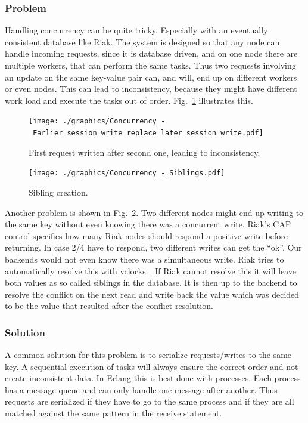 \documentclass[11pt,a4paper]{report}
\begin{document}
\subsubsection{Problem}
Handling concurrency can be quite tricky.
Especially with an eventually consistent database like Riak.
The system is designed so that any node can handle incoming requests,
since it is database driven, and on one node there are multiple workers,
that can perform the same tasks.
Thus two requests involving an update on the same key-value pair can, and will,
end up on different workers or even nodes.
This can lead to inconsistency, because they might have different work load
and execute the tasks out of order.
Fig.~\ref{fig:concurrency:problem_expl} illustrates this.
\begin{figure}[htbp!]
 \centering
 \texttt{[image: ./graphics/Concurrency\_-\_Earlier\_session\_write\_replace\_later\_session\_write.pdf]}
 \vspace{-1cm}
 \caption{First request written after second one, leading to inconsistency.}
 \label{fig:concurrency:problem_expl}
\end{figure}

\begin{figure}[htbp!]
 \hspace{-3cm}
 \texttt{[image: ./graphics/Concurrency\_-\_Siblings.pdf]}
 \vspace{-4cm}
 \caption{Sibling creation.}
 \label{fig:concurrency:siblings}
\end{figure}
Another problem is shown in Fig.~\ref{fig:concurrency:siblings}.
Two different nodes might end up writing to the same key without even knowing
there was a concurrent write.
Riak's CAP control specifies how many Riak nodes should respond a positive write
before returning.
In case 2/4 have to respond, two different writes can get the ``ok''.
Our backends would not even know there was a simultaneous write.
Riak tries to automatically resolve this with vclocks~\cite{vclock}.
If Riak cannot resolve this it will leave both values as so called siblings
in the database.
It is then up to the backend to resolve the conflict on the next read
and write back the value which was decided to be the value that resulted after
the conflict resolution.

\subsubsection{Solution}
A common solution for this problem is to serialize requests/writes to the same
key.
A sequential execution of tasks will always ensure the correct order and not
create inconsistent data.
In Erlang this is best done with processes.
Each process has a message queue and can only handle one message after another.
Thus requests are serialized if they have to go to the same process and if they are
all matched against the same pattern in the receive statement.
\end{document}
